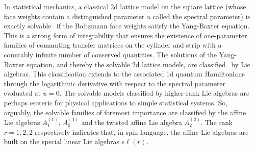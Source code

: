 \documentclass[11pt]{article}
\numberwithin{equation}{section}
\theoremstyle{plain}
\numberwithin{equation}{section}
\begin{document}
In statistical mechanics, a classical 2d lattice model on the square lattice (whose face weights contain a distinguished parameter $u$ called the spectral parameter) is exactly solvable~\cite{BaxterBook1982} if the Boltzmann face weights satisfy the Yang-Baxter equation. This is a strong form of integrability that ensures the existence of one-parameter families of commuting transfer matrices on the cylinder and strip with a countably infinite number of conserved quantities. The solutions of the Yang-Baxter equation, and thereby the solvable 2d lattice models, are classified~\cite{Bazh85,Jimbo86} by Lie algebras. This classification extends to the associated 1d quantum Hamiltonians through the logarithmic derivative with respect to the spectral parameter evaluated at $u=0$. The solvable models classified by higher-rank Lie algebras are perhaps esoteric for physical applications to simple statistical systems. So, arguably, the solvable families of foremost importance are classified by the affine Lie algebras $A_1^{(1)}$, $A_2^{(1)}$ and the twisted affine Lie algebra $A_2^{(2)}$. The rank $r=1,2,2$ respectively indicates that, in spin language, the affine Lie algebras are built on the special linear Lie algebras $s\ell(r)$. 
\end{document}
